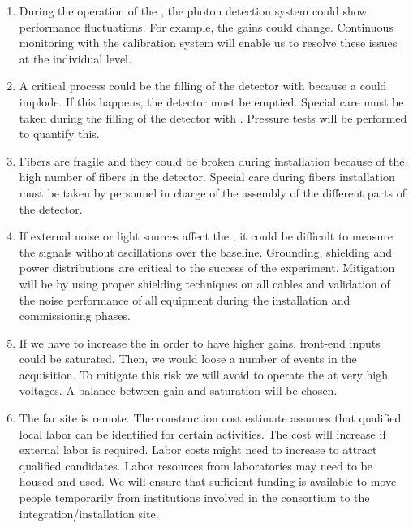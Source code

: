 \begin{enumerate}

\item During the operation of the , the photon detection system could show performance fluctuations. For example, the  gains could change. Continuous monitoring with the  calibration system will enable us to resolve these issues at the individual  level.

\item A critical process could be the filling of the detector with  because a  could implode. If this happens, the detector must be emptied. Special care must be taken during the filling of the detector with . Pressure tests will be performed to quantify this.

\item Fibers are fragile and they could be broken during installation because of the high number of fibers in the detector. Special care during fibers installation must be taken by personnel in charge of the assembly of the different parts of the detector.

\item If external noise or light sources affect the , it could be difficult to measure the signals without oscillations over the baseline. Grounding, shielding and power distributions are critical to the success of the experiment. Mitigation will be by using proper shielding techniques on all cables and validation of the noise performance of all equipment during the installation and commissioning phases.

\item If we have to increase the   in order to have higher gains,  front-end inputs could be saturated. Then, we would loose a number of events in the acquisition. To mitigate this risk we will avoid to operate the  at very high voltages. A balance between gain and saturation will be chosen.

\item The far site is remote. The  construction cost estimate assumes that qualified local labor can be identified for certain activities. The cost will increase if external labor is required. Labor costs might need to increase to attract qualified candidates. Labor resources from laboratories may need to be housed and used. We will ensure that sufficient funding is available to move people temporarily from institutions involved in the  consortium to the integration/installation site.


\end{enumerate}
